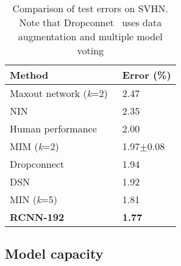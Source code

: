 \documentclass[10pt,twocolumn,letterpaper]{article}
\begin{document}
\begin{table}
\begin{center}
\caption{Comparison of test errors on SVHN. Note that Dropconnet~\cite{wan2013regularization} uses data augmentation and multiple model voting}
\begin{tabular}{|p{1.6in}|p{0.6in}|} \hline 
Method & Error (\%) \\ \hline 
Maxout network (\textit{k}=2)~\cite{goodfellow2013maxout} & 2.47 \\ \hline 
NIN~\cite{DBLP:journals/corr/LinCY13} & 2.35 \\ \hline 
Human performance~\cite{sermanet2012convolutional} & 2.00 \\ \hline 
MIM (\textit{k}=2)~\cite{liao2015importance} & 1.97$\pm $0.08 \\ \hline 
Dropconnect~\cite{wan2013regularization} & 1.94 \\ \hline 
DSN~\cite{lee2014deeply} & 1.92 \\ \hline 
MIN (\textit{k}=5)\textbf{} & 1.81 \\ \hline 
\textbf{RCNN-192}~\cite{Liang_2015_CVPR} & \textbf{1.77} \\ \hline
\end{tabular}
\label{tab:svhn}
\end{center}
\end{table}

\subsection{Model capacity}
\end{document}
